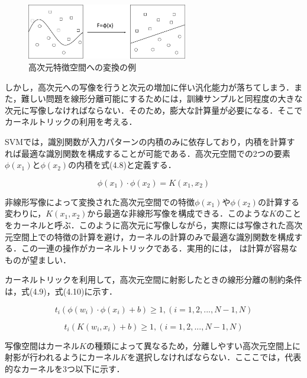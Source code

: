 \begin{figure}[htbp]
  \begin{center}
    \includegraphics[clip,width=7.0cm]{./images/kouji.png}
    \caption{高次元特徴空間への変換の例}
    \label{fig:kouji}
  \end{center}
\end{figure}

しかし，高次元への写像を行うと次元の増加に伴い汎化能力が落ちてしまう．また，難しい問題を線形分離可能にするためには，訓練サンプルと同程度の大きな次元に写像しなければならない．そのため，膨大な計算量が必要になる．そこでカーネルトリックの利用を考える．

SVMでは，識別関数が入力パターンの内積のみに依存しており，内積を計算すれば最適な識別関数を構成することが可能である．高次元空間での2つの要素$ \phi(x_1)$と$ \phi(x_2)$の内積を式(4.8)と定義する．

\begin{equation}
      \phi(x_1) \cdot \phi(x_2) = K(x_1,x_2)
\end{equation}

非線形写像によって変換された高次元空間での特徴$ \phi(x_1)$や$ \phi(x_2)$の計算する変わりに，$K(x_1,x_2)$から最適な非線形写像を構成できる．このような$ K $のことをカーネルと呼ぶ．このように高次元に写像しながら，実際には写像された高次元空間上での特徴の計算を避け，カーネルの計算のみで最適な識別関数を構成する．この一連の操作がカーネルトリックである．実用的には， は計算が容易なものが望ましい．

\newpage

カーネルトリックを利用して，高次元空間に射影したときの線形分離の制約条件は，式(4.9)，式(4.10)に示す．

\begin{equation}
      t_i(\phi(w_i) \cdot \phi(x_i) + b) \geq 1, (i = 1,2,...,N-1,N)
\end{equation}

\begin{equation}
      t_i(K(w_i,x_i) + b) \geq 1, (i = 1,2,...,N-1,N)
\end{equation}


写像空間はカーネル$K$の種類によって異なるため，分離しやすい高次元空間上に射影が行われるようにカーネル$K$を選択しなければならない．こここでは，代表的なカーネルを3つ以下に示す．

